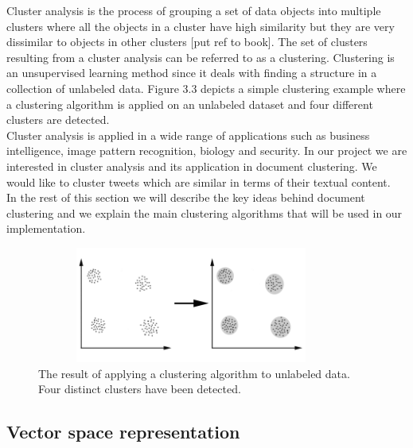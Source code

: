 Cluster analysis is the process of grouping a set of data objects into multiple clusters where all the
objects in a cluster have high similarity but they are very dissimilar to objects in other clusters [put ref to book]. The set
of clusters resulting from a cluster analysis can be referred to as a clustering. Clustering is an unsupervised 
learning method since it deals with finding a structure in a collection of unlabeled data. Figure 3.3 depicts a simple 
clustering example where a clustering algorithm is applied on an unlabeled dataset and four different clusters are detected.\\
Cluster analysis is applied in a wide range of applications such as business intelligence, image pattern recognition, biology and 
security. In our project we are interested in cluster analysis and its application in document clustering. We would like to cluster tweets 
which are similar in terms of their textual content.\\
In the rest of this section we will describe the key ideas behind document clustering and we explain the main clustering algorithms that
will be used in our implementation.

\begin{figure}[!htbp]
  \begin{center}
    \includegraphics[height=1.5in, width=4in]{clustering}
    \caption{The result of applying a clustering algorithm to unlabeled data. Four distinct clusters have been detected.}
    \label{ClusteringExample}
  \end{center}
\end{figure} 

\subsection{Vector space representation}

